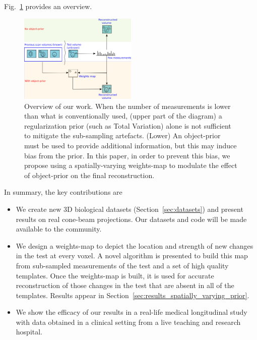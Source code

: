 \documentclass[journal]{IEEEtran}
\begin{document}
Fig.~\ref{fig:prior_overview} provides an overview.


 \begin{figure}[h]
\centering
	\includegraphics[width=0.5\textwidth]{../images/prior_cmb.png}
        \caption{Overview of our work. When the number of measurements is lower than what is conventionally used, (upper part of the diagram) a regularization prior (such as Total Variation) alone is not sufficient to mitigate the sub-sampling artefacts. (Lower) An object-prior must be used to provide additional information, but this may induce bias from the prior. In this paper, in order to prevent this bias, we propose using a spatially-varying weights-map to modulate the effect of object-prior on the final reconstruction.}
 \label{fig:prior_overview}
\end{figure}

In summary, the key contributions are
\begin{itemize}
\item We create new 3D biological datasets (Section~\ref{sec:datasets}) and
  present results on real cone-beam projections. Our datasets and code
  will be made available to the community.
  \item We design a weights-map
    to depict the location and strength of new changes in the test at
    every voxel. A novel algorithm is presented to build this map from
    sub-sampled measurements of the test and a set of high quality
    templates. Once the weights-map is built, it is used for accurate
    reconstruction of those changes in the test that are absent in all
    of the templates. Results appear in
    Section~\ref{sec:results_spatially_varying_prior}.
  \item We show the efficacy of our results in a real-life medical
    longitudinal study with data obtained in a clinical setting from
    a live teaching and
    research hospital.
\end{itemize}
\end{document}
